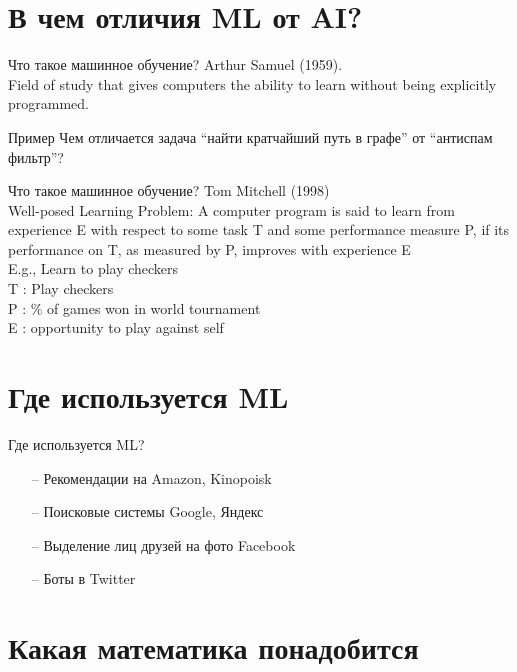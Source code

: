 \documentclass[10pt]{beamer}
\begin{document}
\section{В чем отличия ML от AI?}

\begin{frame}{Что такое машинное обучение?}
	Arthur Samuel (1959). \\
	\bigbreak
	Field of study that gives computers the ability to learn without being explicitly programmed.
\end{frame}

\begin{frame}{Пример}
  Чем отличается задача “найти кратчайший путь в графе” от “антиспам фильтр”?
\end{frame}

\begin{frame}{Что такое машинное обучение?}
	Tom Mitchell (1998) \\
	\bigbreak
	Well-posed Learning Problem: A computer program is said to learn from experience E with respect to some task T and some performance measure P, if its performance on T, as measured by P, improves with experience E\\
	\bigbreak
	E.g., Learn to play checkers\\ 
	\bigbreak
	T : Play checkers\\
	P : \% of games won in world tournament\\
	E : opportunity to play against self\\
\end{frame}

\section{Где используется ML}

\begin{frame}{Где используется ML?}
	\begin{itemize}
	  \item[--] Рекомендации на Amazon, Kinopoisk
	  \item[--] Поисковые системы Google, Яндекс
	  \item[--] Выделение лиц друзей на фото Facebook
	  \item[--] Боты в Twitter
	\end{itemize}
\end{frame}

\section{Какая математика понадобится}
\end{document}
